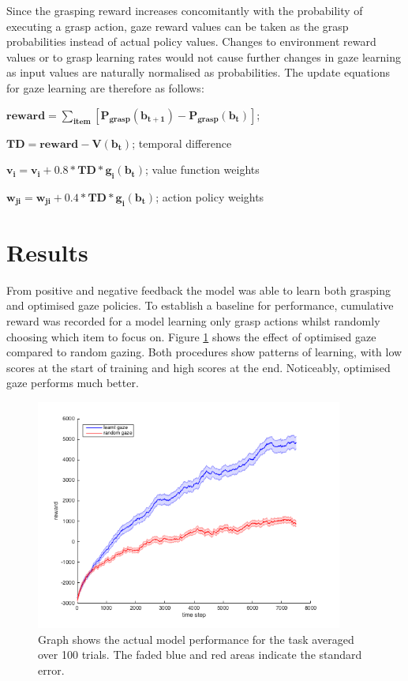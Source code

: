 \documentclass[11]{article}
\begin{document}
Since the grasping reward increases concomitantly with the probability of executing a grasp action, gaze reward values can be taken as the grasp probabilities instead of actual policy values. 
Changes to environment reward values or to grasp learning rates would not cause further changes in gaze learning as input values are naturally normalised as probabilities.
The update equations for gaze learning are therefore as follows: 
\begin{list}{}{}
  \item $\pmb{reward = \sum_{item}[P_{grasp}(b_{t+1}) -  P_{grasp}(b_t)] }$; 
  \item $\pmb{TD = reward - V(b_t)}$; temporal difference
  \item $\pmb{ v_i = v_i + 0.8 * TD * g_i(b_t)}$; value function weights
  \item $\pmb{w_{ji} = w_{ji}+ 0.4 * TD * g_i(b_t)}$; action policy weights
\end{list}  

\section{Results}
From positive and negative feedback the model was able to learn both grasping and optimised gaze policies.
To establish a baseline for performance, cumulative reward was recorded for a model learning only grasp actions whilst randomly choosing which item to focus on.
Figure \ref{fig:results} shows the effect of optimised gaze compared to random gazing. 
Both procedures show patterns of learning, with low scores at the start of training and high scores at the end.   
Noticeably, optimised gaze performs much better.

\begin{figure}[!h]
	\centering
	\includegraphics[width=0.9\textwidth]{figures/results.png}
	\caption{Graph shows the actual model performance for the task averaged over 100 trials. The faded blue and red areas indicate the standard error.}
	\label{fig:results}
\end{figure}
\end{document}
